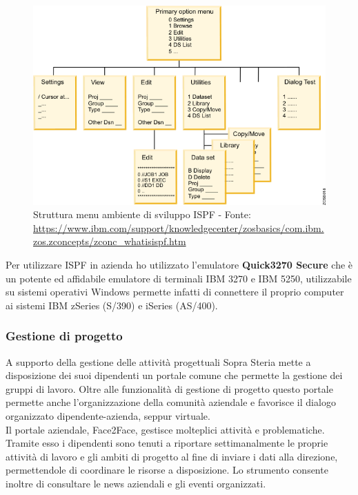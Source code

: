 	\begin{figure}[H]
		\centering
	   	\includegraphics[width=1\textwidth]{immagini/ISPF_menu_structure}
	   	\caption{Struttura menu ambiente di sviluppo ISPF - Fonte: \url{https://www.ibm.com/support/knowledgecenter/zosbasics/com.ibm.zos.zconcepts/zconc_whatisispf.htm}}
	\end{figure}

	Per utilizzare ISPF in azienda ho utilizzato l'emulatore \textbf{Quick3270 Secure} che è un potente ed affidabile emulatore di terminali IBM 3270 e IBM 5250, utilizzabile su sistemi operativi Windows permette infatti di connettere il proprio computer ai sistemi IBM zSeries (S/390) e iSeries (AS/400).

	\subsubsection{Gestione di progetto}

	A supporto della gestione delle attività progettuali Sopra Steria mette a disposizione dei suoi dipendenti un portale comune che permette la gestione dei gruppi di lavoro. Oltre alle funzionalità di gestione di progetto questo portale permette anche l'organizzazione della comunità aziendale e favorisce il dialogo organizzato dipendente-azienda, seppur virtuale.\\
	
	Il portale aziendale, Face2Face, gestisce molteplici attività e problematiche. Tramite esso i dipendenti sono tenuti a riportare settimanalmente le proprie attività di lavoro e gli ambiti di progetto al fine di inviare i dati alla direzione, permettendole di coordinare le risorse a disposizione. Lo strumento consente inoltre di consultare le news aziendali e gli eventi organizzati.

